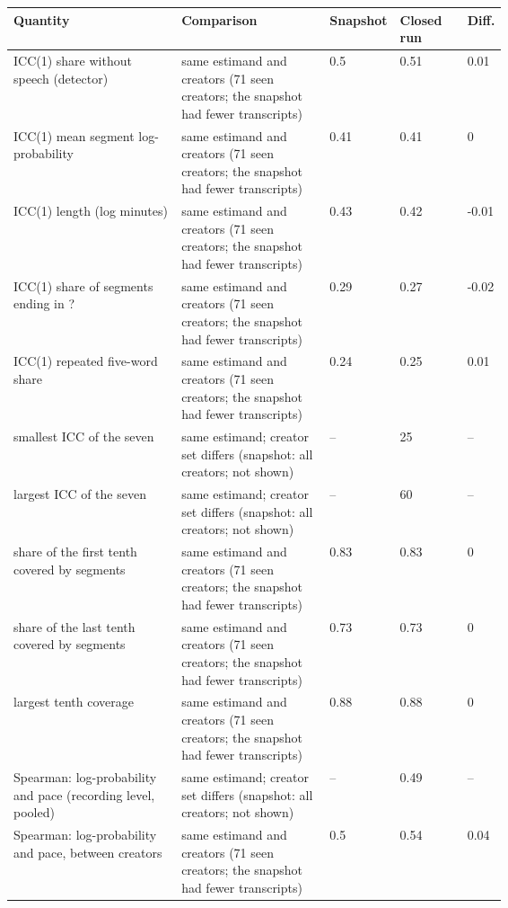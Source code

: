 {\scriptsize\setlength{\tabcolsep}{2pt}
\begin{tabular}{@{}p{0.34\linewidth}p{0.3\linewidth}lll@{}}
\toprule
Quantity & Comparison & Snapshot & Closed run & Diff. \\
\midrule
ICC(1) share without speech (detector) & same estimand and creators (71 seen creators; the snapshot had fewer transcripts) & 0.5 & 0.51 & 0.01 \\
ICC(1) mean segment log-probability & same estimand and creators (71 seen creators; the snapshot had fewer transcripts) & 0.41 & 0.41 & 0 \\
ICC(1) length (log minutes) & same estimand and creators (71 seen creators; the snapshot had fewer transcripts) & 0.43 & 0.42 & -0.01 \\
ICC(1) share of segments ending in ? & same estimand and creators (71 seen creators; the snapshot had fewer transcripts) & 0.29 & 0.27 & -0.02 \\
ICC(1) repeated five-word share & same estimand and creators (71 seen creators; the snapshot had fewer transcripts) & 0.24 & 0.25 & 0.01 \\
smallest ICC of the seven & same estimand; creator set differs (snapshot: all creators; not shown) & -- & 25 & -- \\
largest ICC of the seven & same estimand; creator set differs (snapshot: all creators; not shown) & -- & 60 & -- \\
share of the first tenth covered by segments & same estimand and creators (71 seen creators; the snapshot had fewer transcripts) & 0.83 & 0.83 & 0 \\
share of the last tenth covered by segments & same estimand and creators (71 seen creators; the snapshot had fewer transcripts) & 0.73 & 0.73 & 0 \\
largest tenth coverage & same estimand and creators (71 seen creators; the snapshot had fewer transcripts) & 0.88 & 0.88 & 0 \\
Spearman: log-probability and pace (recording level, pooled) & same estimand; creator set differs (snapshot: all creators; not shown) & -- & 0.49 & -- \\
Spearman: log-probability and pace, between creators & same estimand and creators (71 seen creators; the snapshot had fewer transcripts) & 0.5 & 0.54 & 0.04 \\

\end{tabular}}
